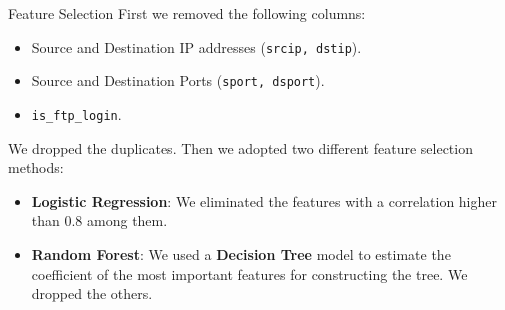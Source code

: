 \documentclass[12pt,aspectratio=169,notheorems]{beamer}
\begin{document}
\begin{frame}{Feature Selection}
    First we removed the following columns:
    \begin{itemize}
        \item Source and Destination IP addresses (\texttt{srcip, dstip}).
        \item Source and Destination Ports (\texttt{sport, dsport}).
        \item \texttt{is\_ftp\_login}.
    \end{itemize}
    We dropped the duplicates. Then we adopted two different feature selection methods:
    \begin{itemize}
        \item \textbf{Logistic Regression}: We eliminated the features with a correlation higher than 0.8 among them.
        \item \textbf{Random Forest}: We used a \textbf{Decision Tree} model to estimate the coefficient of the most important features for constructing the tree. We dropped the others.
    \end{itemize}
\end{frame}
\end{document}
